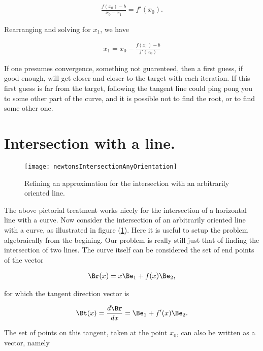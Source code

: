 \begin{align}\label{eqn:intersectionNewton:10}
\frac{f(x_0) - b}{x_0 - x_1} = f'(x_0).
\end{align}

Rearranging and solving for $x_1$, we have

\begin{align}\label{eqn:intersectionNewton:11}
x_1 = x_0 - \frac{f(x_0) - b}{f'(x_0)}
\end{align}

If one presumes convergence, something not guarenteed, then a first guess, if good enough, will get closer and closer to the target with each iteration.  If this first guess is far from the target, following the tangent line could ping pong you to some other part of the curve, and it is possible not to find the root, or to find some other one.

\section{Intersection with a line.}

\begin{figure}[htp]
\centering
\texttt{[image: newtonsIntersectionAnyOrientation]}
\caption{Refining an approximation for the intersection with an arbitrarily oriented line.}\label{fig:newtonsIntersectionAnyOrientation}
\end{figure}

The above pictorial treatment works nicely for the intersection of a horizontal line with a curve.  Now consider the intersection of an arbitrarily oriented line with a curve, as illustrated in figure (\ref{fig:newtonsIntersectionAnyOrientation}).  Here it is useful to setup the problem algebraically from the begining.  Our problem is really still just that of finding the intersection of two lines.  The curve itself can be considered the set of end points of the vector

\begin{align}\label{eqn:intersectionNewton:20}
\Br(x) = x \Be_1 + f(x) \Be_2,
\end{align}

for which the tangent direction vector is 

\begin{align}\label{eqn:intersectionNewton:21}
\Bt(x) = \frac{d\Br}{dx} = \Be_1 + f'(x) \Be_2.
\end{align}

The set of points on this tangent, taken at the point $x_0$, can also be written as a vector, namely

